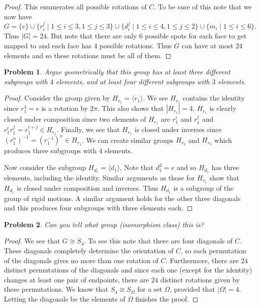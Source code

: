 \documentclass{article}
\newtheorem{problem}{Problem}
\begin{document}
\begin{proof}
This enumerates all possible rotations of $C$. To be sure of this note that we now have
\[
G = \{e\} \cup \{r_i^j \mid 1 \leq i \leq 3, 1 \leq j \leq 3\} \cup \{d_i^j \mid 1 \leq i \leq 4, 1 \leq j \leq 2\} \cup \{m_i \mid 1 \leq i \leq 6\}.
\]
Thus $|G| = 24$. But note that there are only $6$ possible spots for each face to get mapped to and each face has $4$ possible rotations. Thus $G$ can have at most $24$ elements and so these rotations must be all of them.
\end{proof}

\begin{problem}
Argue geometrically that this group has at least three different subgroups with $4$ elements, and at least four different subgroups with $3$ elements.
\end{problem}
\begin{proof}
Consider the group given by $H_{r_1} = \langle r_1 \rangle$. We see $H_{r_1}$ contains the identity since $r_1^4 = e$ is a rotation by $2 \pi$. This also shows that $|H_{r_1}| = 4$. $H_{r_1}$ is clearly closed under composition since two elements of $H_{r_1}$ are $r_1^i$ and $r_1^j$ and $r_1^i r_1^j = r_1^{i+j} \in H_{r_1}$. Finally, we see that $H_{r_1}$ is closed under inverses since $(r_1^n)^{-1} = (r_1^{-1})^n \in H_{r_1}$. We can create similar groups $H_{r_2}$ and $H_{r_3}$ which produces three subgroups with $4$ elements.

Now consider the subgroup $H_{d_1} = \langle d_1 \rangle$. Note that $d_1^3 = e$ and so $H_{d_1}$ has three elements, including the identity. Similar arguments as those for $H_{r_1}$ show that $H_{d_1}$ is closed under composition and inverses. Thus $H_{d_1}$ is a subgroup of the group of rigid motions. A similar argument holds for the other three diagonals and this produces four subgroups with three elements each.
\end{proof}

\begin{problem}
Can you tell what group (isomorphism class) this is?
\end{problem}
\begin{proof}
We see that $G \cong S_4$. To see this note that there are four diagonals of $C$. These diagonals completely determine the orientation of $C$, so each permutation of the diagonals gives no more than one rotation of $C$. Furthermore, there are $24$ distinct permutations of the diagonals and since each one (except for the identity) changes at least one pair of endpoints, there are $24$ distinct rotations given by these permutations. We know that $S_4 \cong S_{\Omega}$ for a set $\Omega$, provided that $|\Omega| = 4$. Letting the diagonals be the elements of $\Omega$ finishes the proof.
\end{proof}
\end{document}
